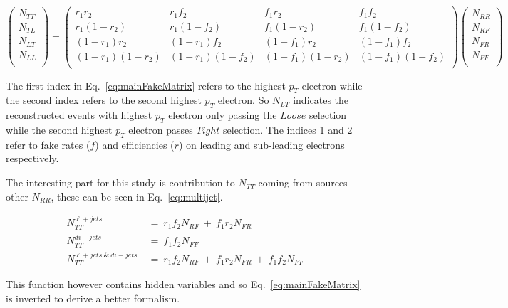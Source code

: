 \begin{equation} \label{eq:mainFakeMatrix}
   \begin{pmatrix}
      N_{TT} \\
      N_{TL} \\
      N_{LT} \\
      N_{LL} \\
   \end{pmatrix}
   =
   \begin{pmatrix}
      r_{1}r_{2} & r_{1}f_{2} & f_{1}r_{2} & f_{1}f_{2} \\
      r_{1}(1-r_{2}) & r_{1}(1-f_{2}) & f_{1}(1-r_{2}) & f_{1}(1-f_{2}) \\
      (1-r_{1})r_{2} & (1-r_{1})f_{2} & (1-f_{1})r_{2} & (1-f_{1})f_{2} \\
      (1-r_{1})(1-r_{2}) & (1-r_{1})(1-f_{2}) & (1-f_{1})(1-r_{2}) & (1-f_{1})(1-f_{2}) \\
   \end{pmatrix}
   \begin{pmatrix}
      N_{RR} \\
      N_{RF} \\
      N_{FR} \\
      N_{FF} \\
   \end{pmatrix}
\end{equation}

The first index in Eq.~\ref{eq:mainFakeMatrix} refers to the highest $p_{T}$ electron while the second index refers to the second highest $p_{T}$ electron. So $N_{LT}$ indicates the reconstructed events with highest $p_{T}$ electron only passing the $Loose$ selection while the second highest $p_{T}$ electron passes $Tight$ selection. The indices 1 and 2 refer to fake rates ($f$) and efficiencies ($r$) on leading and sub-leading electrons respectively.

The interesting part for this study is contribution to $N_{TT}$ coming from sources other $N_{RR}$, these can be seen in Eq.~\ref{eq:multijet}.

\begin{align} \label{eq:multijet}
   N^{\ell+jets}_{TT}~&=~r_{1}f_{2}N_{RF}~+~f_{1}r_{2}N_{FR} \nonumber \\
   N^{di-jets}_{TT}~&=~f_{1}f_{2}N_{FF} \nonumber \\
   N^{\ell+jets~\&~di-jets}_{TT}~&=~r_{1}f_{2}N_{RF}~+~f_{1}r_{2}N_{FR}~+~f_{1}f_{2}N_{FF} 
\end{align}

This function however contains hidden variables and so Eq.~\ref{eq:mainFakeMatrix} is inverted to derive a better formalism.

